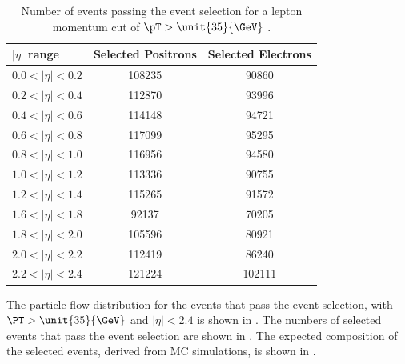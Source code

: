 \begin{table}[htbp]
 \begin{center}
 \begin{tabular}{lcc}
\toprule
 $|\eta|$ range & Selected Positrons & Selected Electrons\\
 \midrule
 $0.0<| \eta |<0.2$ & 108235 &  90860 \\
 $0.2<| \eta |<0.4$ & 112870 &  93996 \\
 $0.4<| \eta |<0.6$ & 114148 &  94721 \\
 $0.6<| \eta |<0.8$ & 117099 &  95295 \\
 $0.8<| \eta |<1.0$ & 116956 &  94580 \\
 $1.0<| \eta |<1.2$ & 113336 &  90755 \\
 $1.2<| \eta |<1.4$ & 115265 &  91572 \\
 $1.6<| \eta |<1.8$ &  92137 &  70205 \\
 $1.8<| \eta |<2.0$ & 105596 &  80921 \\
 $2.0<| \eta |<2.2$ & 112419 &  86240 \\
 $2.2<| \eta |<2.4$ & 121224 & 102111 \\
\bottomrule
 \end{tabular}
 \caption[Number of events passing the event selection for a lepton momentum cut
 of {$\pT>\unit{35}{\GeV}$}.]{Number of events passing the event selection for a lepton momentum cut
 of $\pT>\unit{35}{\GeV}$ \cite{bendavid2011electron}.}
\label{tab:updatedselectedevents}
\end{center}
\end{table}

The particle flow \ETm distribution for the events that pass the event
selection, with $\PT > \unit{35}{\GeV}$ and $|\eta| < 2.4$ is shown in
.
The numbers of selected events that pass the event selection are shown in
. 
The expected composition of the selected events, derived from MC simulations, is
shown in . 

